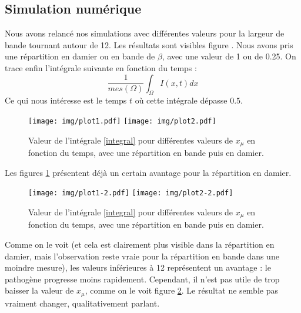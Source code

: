 \documentclass{article}
\begin{document}
\clearpage
\subsection{Simulation numérique}
Nous avons relancé nos simulations avec différentes valeurs pour la largeur de bande tournant autour de 12. Les résultats sont visibles figure \label{figProp1}. Nous avons pris une répartition en damier ou en bande de $\beta$, avec une valeur de 1 ou de 0.25. On trace enfin l'intégrale suivante en fonction du temps :
\begin{equation}\label{integral}
	\frac{1}{mes(\Omega)}\int_\Omega I(x,t) dx
\end{equation}
Ce qui nous intéresse est le temps $t$ où cette intégrale dépasse $0.5$.
\begin{figure}[!h]
\centering
	\texttt{[image: img/plot1.pdf]}
	\texttt{[image: img/plot2.pdf]}
\caption{Valeur de l'intégrale \ref{integral} pour différentes valeurs de $x_{\mu}$ en fonction du temps, avec une répartition en bande puis en damier.}
\label{figProp1}
\end{figure}

Les figures \ref{figProp1} présentent déjà un certain avantage pour la répartition en damier. 

\begin{figure}[!h]
\centering
	\texttt{[image: img/plot1-2.pdf]}
	\texttt{[image: img/plot2-2.pdf]}
\caption{Valeur de l'intégrale \ref{integral} pour différentes valeurs de $x_{\mu}$ en fonction du temps, avec une répartition en bande puis en damier.}
\label{figProp2}
\end{figure}

Comme on le voit (et cela est clairement plus visible dans la répartition en damier, mais l'observation reste vraie pour la répartition en bande dans une moindre mesure), les valeurs inférieures à 12 représentent un avantage : le pathogène progresse moins rapidement. Cependant, il n'est pas utile de trop baisser la valeur de $x_{\mu}$, comme on le voit figure \ref{figProp2}. Le résultat ne semble pas vraiment changer, qualitativement parlant.


%
\clearpage
\end{document}

